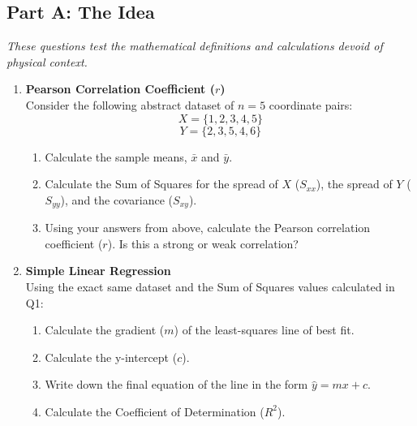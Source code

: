 \subsection*{Part A: The Idea}
\textit{These questions test the mathematical definitions and calculations devoid of physical context.}

\begin{enumerate}[label=\textbf{Q\arabic*.}, leftmargin=*]
    
    \item \textbf{Pearson Correlation Coefficient ($r$)} \\
    Consider the following abstract dataset of $n=5$ coordinate pairs: 
    \[ X = \{ 1, 2, 3, 4, 5 \} \]
    \[ Y = \{ 2, 3, 5, 4, 6 \} \]
    \begin{enumerate}[label=\arabic*.]
        \item Calculate the sample means, $\bar{x}$ and $\bar{y}$.
        \item Calculate the Sum of Squares for the spread of $X$ ($S_{xx}$), the spread of $Y$ ($S_{yy}$), and the covariance ($S_{xy}$).
        \item Using your answers from above, calculate the Pearson correlation coefficient ($r$). Is this a strong or weak correlation?
    \end{enumerate}
    \vspace{0.3cm}

    \item \textbf{Simple Linear Regression} \\
    Using the exact same dataset and the Sum of Squares values calculated in Q1:
    \begin{enumerate}[label=\arabic*.]
        \item Calculate the gradient ($m$) of the least-squares line of best fit.
        \item Calculate the y-intercept ($c$). 
        \item Write down the final equation of the line in the form $\hat{y} = mx + c$.
        \item Calculate the Coefficient of Determination ($R^2$). 
    \end{enumerate}
    \vspace{0.3cm}


\end{enumerate}
